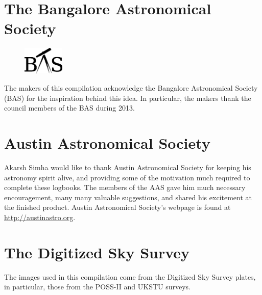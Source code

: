 \section*{The Bangalore Astronomical Society}
\begin{figure}
\vspace{-15pt}
\centering
\includegraphics[width=0.175\textwidth]{BASlogo.eps}
\vspace{-30pt}
\end{figure}
The makers of this compilation acknowledge the Bangalore Astronomical
Society (BAS) for the inspiration behind this idea. In particular, the
makers thank the council members of the BAS during 2013.\\
\vspace{10pt}
\section*{Austin Astronomical Society}
Akarsh Simha would like to thank Austin Astronomical Society for
keeping his astronomy spirit alive, and providing some of the
motivation much required to complete these logbooks. The members of
the AAS gave him much necessary encouragement, many many valuable
suggestions, and shared his excitement at the finished product. Austin
Astronomical Society's webpage is found at
\url{http://austinastro.org}. \\ 


\vspace{5pt}

\section*{The Digitized Sky Survey}
The images used in this compilation come from the Digitized Sky Survey
plates, in particular, those from the POSS-II and UKSTU surveys.

